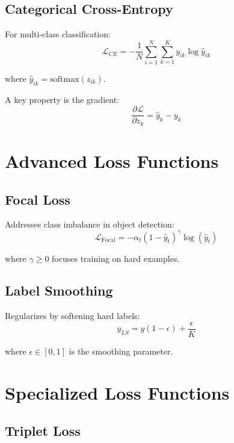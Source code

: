 \subsection{Categorical Cross-Entropy}

For multi-class classification:
\begin{equation}
\mathcal{L}_{CE} = -\frac{1}{N}\sum_{i=1}^{N}\sum_{k=1}^{K} y_{ik} \log \hat{y}_{ik}
\end{equation}

where $\hat{y}_{ik} = \text{softmax}(z_{ik})$.

A key property is the gradient:
\begin{equation}
\frac{\partial \mathcal{L}}{\partial z_k} = \hat{y}_k - y_k
\end{equation}

\section{Advanced Loss Functions}

\subsection{Focal Loss}

Addresses class imbalance in object detection:
\begin{equation}
\mathcal{L}_{\text{Focal}} = -\alpha_t (1 - \hat{y}_t)^\gamma \log(\hat{y}_t)
\end{equation}

where $\gamma \geq 0$ focuses training on hard examples.

\subsection{Label Smoothing}

Regularizes by softening hard labels:
\begin{equation}
y_{LS} = y(1 - \epsilon) + \frac{\epsilon}{K}
\end{equation}

where $\epsilon \in [0, 1]$ is the smoothing parameter.

\section{Specialized Loss Functions}

\subsection{Triplet Loss}

